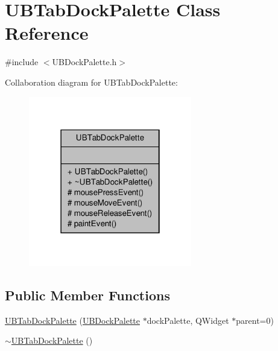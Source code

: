 \hypertarget{class_u_b_tab_dock_palette}{\section{U\-B\-Tab\-Dock\-Palette Class Reference}
\label{d9/dfa/class_u_b_tab_dock_palette}
}


{\ttfamily \#include $<$U\-B\-Dock\-Palette.\-h$>$}



Collaboration diagram for U\-B\-Tab\-Dock\-Palette\-:
\nopagebreak
\begin{figure}[H]
\begin{center}
\leavevmode
\includegraphics[width=202pt]{db/d5f/class_u_b_tab_dock_palette__coll__graph}
\end{center}
\end{figure}
\subsection*{Public Member Functions}
\begin{DoxyCompactItemize}
\item 
\hyperlink{class_u_b_tab_dock_palette_a6f235b1416e3461a9a34a3188037d83d}{U\-B\-Tab\-Dock\-Palette} (\hyperlink{class_u_b_dock_palette}{U\-B\-Dock\-Palette} $\ast$dock\-Palette, Q\-Widget $\ast$parent=0)
\item 
\hyperlink{class_u_b_tab_dock_palette_a201f25541d09bd79a0ce85189b362ade}{$\sim$\-U\-B\-Tab\-Dock\-Palette} ()
\end{DoxyCompactItemize}
